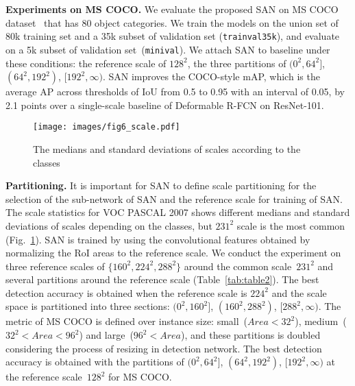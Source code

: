 \documentclass[runningheads]{llncs}
\begin{document}
\noindent
\textbf{Experiments on MS COCO.}
We evaluate the proposed SAN on MS COCO dataset~\cite{lin2014microsoft} that has 80 object categories.
We train the models on the union set of 80k training set and a 35k subset of validation set (\texttt{trainval35k}),
and evaluate on a 5k subset of validation set~(\texttt{minival}).
We attach SAN to baseline under these conditions: 
the reference scale of $128^2$, 
the three partitions of $(0^2,64^2]$, $(64^2,192^2)$, $[192^2,\infty)$. 
SAN improves the COCO-style mAP, which is the average AP across thresholds of IoU from 0.5 to 0.95 with an interval of 0.05, by 2.1 points over a single-scale baseline of Deformable R-FCN on ResNet-101.
\\


\begin{figure}[t]
	\texttt{[image: images/fig6\_scale.pdf]}
	\caption{The medians and standard deviations of scales according to the classes}
	\centering
	\label{fig:SAN_scale}
\end{figure}




\noindent
\textbf{Partitioning.}
It is important for SAN to define scale partitioning for the selection of the sub-network of SAN and the reference scale for training of SAN.
The scale statistics for VOC PASCAL 2007 shows different medians and standard deviations of scales depending on the classes, but $231^2$ scale is the most common (Fig.~\ref{fig:SAN_scale}).
SAN is trained by using the convolutional features obtained by normalizing the RoI areas to the reference scale.
We conduct the experiment on three reference scales of $\{160^2, 224^2, 288^2\}$ around the common scale~$231^2$ and several partitions around the reference scale (Table~\ref{tab:table2}).
The best detection accuracy is obtained when the reference scale is $224^2$ and the scale space is partitioned into three sections: $(0^2,160^2]$, $(160^2,288^2)$, $[288^2,\infty)$.
The metric of MS COCO is defined over instance size: 
small~($Area<32^2$), medium~($32^2<Area<96^2$) and large~($96^2<Area$),
and
these partitions is doubled considering the process of resizing in detection network.
The best detection accuracy is obtained with
the partitions of $(0^2,64^2]$, $(64^2,192^2)$, $[192^2,\infty)$ at the reference scale~$128^2$
for MS COCO.
\\
\end{document}

